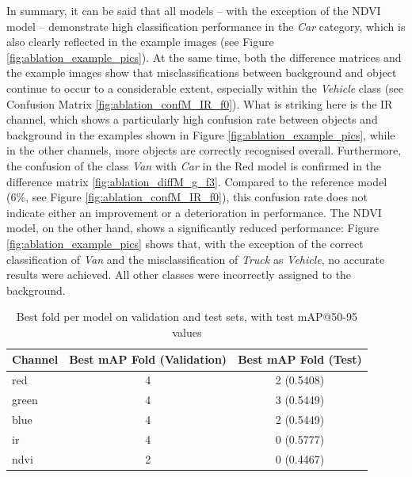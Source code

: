In summary, it can be said that all models – with the exception of the NDVI model – demonstrate high classification performance in the \textit{Car} category, which is also clearly reflected in the example images (see Figure \ref{fig:ablation_example_pics}). At the same time, both the difference matrices and the example images show that misclassifications between background and object continue to occur to a considerable extent, especially within the \textit{Vehicle} class (see Confusion Matrix \ref{fig:ablation_confM_IR_f0}). What is striking here is the IR channel, which shows a particularly high confusion rate between objects and background in the examples shown in Figure \ref{fig:ablation_example_pics}, while in the other channels, more objects are correctly recognised overall. Furthermore, the confusion of the class \textit{Van} with \textit{Car} in the Red model is confirmed in the difference matrix \ref{fig:ablation_diffM_g_f3}. Compared to the reference model (6\%, see Figure \ref{fig:ablation_confM_IR_f0}), this confusion rate does not indicate either an improvement or a deterioration in performance. The NDVI model, on the other hand, shows a significantly reduced performance: Figure \ref{fig:ablation_example_pics} shows that, with the exception of the correct classification of \textit{Van} and the misclassification of \textit{Truck} as \textit{Vehicle}, no accurate results were achieved. All other classes were incorrectly assigned to the background.






\begin{table}[h]
\centering
\begin{tabular}{l c c}
\hline
\textbf{Channel} & \textbf{Best mAP Fold (Validation)} & \textbf{Best mAP Fold (Test)} \\ 
\hline
red   & 4 & 2 (0.5408) \\
green & 4 & 3 (0.5449) \\
blue  & 4 & 2 (0.5449) \\
ir    & 4 & 0 (0.5777) \\
ndvi  & 2 & 0 (0.4467) \\
\hline
\end{tabular}
\caption{Best fold per model on validation and test sets, with test mAP@50-95 values}
\label{tab:ablation_best_folds_test}
\end{table}





